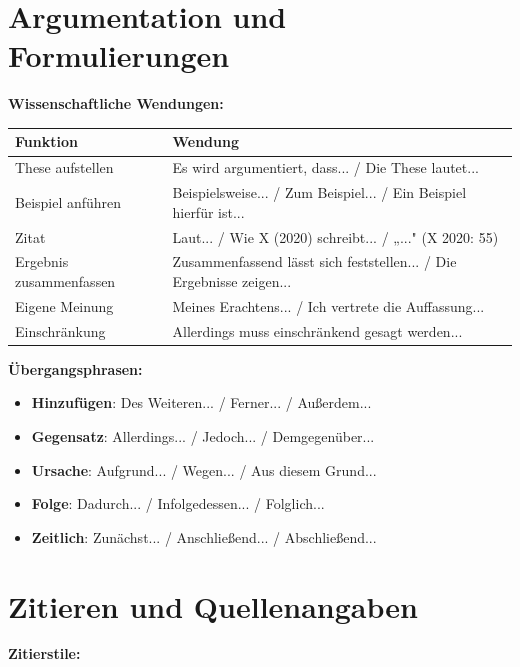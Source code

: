 \section{Argumentation und Formulierungen}
\label{sec:Argumentation}

\bigskip
\noindent\textbf{Wissenschaftliche Wendungen:}

\begin{center}
\begin{tabular}{|l|p{8cm}|}
\hline
Funktion & Wendung \\ \hline
These aufstellen & Es wird argumentiert, dass... / Die These lautet... \\ \hline
Beispiel anführen & Beispielsweise... / Zum Beispiel... / Ein Beispiel hierfür ist... \\ \hline
Zitat & Laut... / Wie X (2020) schreibt... / „..." (X 2020: 55) \\ \hline
Ergebnis zusammenfassen & Zusammenfassend lässt sich feststellen... / Die Ergebnisse zeigen... \\ \hline
Eigene Meinung & Meines Erachtens... / Ich vertrete die Auffassung... \\ \hline
Einschränkung & Allerdings muss einschränkend gesagt werden... \\ \hline
\end{tabular}
\end{center}

\bigskip
\noindent\textbf{Übergangsphrasen:}

\begin{itemize}
    \item \textbf{Hinzufügen}: Des Weiteren... / Ferner... / Außerdem...
    \item \textbf{Gegensatz}: Allerdings... / Jedoch... / Demgegenüber...
    \item \textbf{Ursache}: Aufgrund... / Wegen... / Aus diesem Grund...
    \item \textbf{Folge}: Dadurch... / Infolgedessen... / Folglich...
    \item \textbf{Zeitlich}: Zunächst... / Anschließend... / Abschließend...
\end{itemize}

\section{Zitieren und Quellenangaben}
\label{sec:Zitieren}

\bigskip
\noindent\textbf{Zitierstile:}

